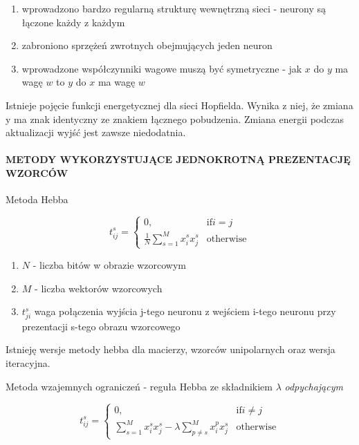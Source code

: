 \begin{enumerate}
 \item wprowadzono bardzo regularną strukturę wewnętrzną sieci - neurony są łączone każdy z każdym
 
 \item zabroniono sprzężeń zwrotnych obejmujących jeden neuron
 
 \item wprowadzone współczynniki wagowe muszą być symetryczne - jak $x$ do $y$ ma wagę $w$ to $y$ do $x$ ma wagę $w$
 
\end{enumerate}

Istnieje pojęcie funkcji energetycznej dla sieci Hopfielda. Wynika z niej, że zmiana y ma znak identyczny
ze znakiem łącznego pobudzenia. Zmiana energii podczas aktualizacji wyjść jest zawsze niedodatnia.

\paragraph{METODY WYKORZYSTUJĄCE JEDNOKROTNĄ PREZENTACJĘ WZORCÓW}

Metoda Hebba

\begin{equation}
 t_{ij}^s = \begin{cases}
    0,& \text{if} i = j \\
    \frac{1}{N} \sum_{s=1}^M x_i^s x_j^s & \text{otherwise} 
\end{cases}
\end{equation}

\begin{enumerate}
 \item $N$ - liczba bitów w obrazie wzorcowym
 \item $M$ - liczba wektorów wzorcowych
 \item $t_{ji}^s$ waga połączenia wyjścia j-tego neuronu z wejściem i-tego neuronu przy prezentacji s-tego obrazu wzorcowego
\end{enumerate}

Istnieję wersje metody hebba dla macierzy, wzorców unipolarnych oraz wersja iteracyjna.

Metoda wzajemnych ograniczeń - reguła Hebba ze składnikiem $\lambda$ \textit{odpychającym}

\begin{equation}
 t_{ij}^s = \begin{cases}
    0,& \text{if} i \ne j \\
    \sum_{s=1}^M x_i^s x_j^s - \lambda \sum_{p \ne s}^M x_i^p x_j^s & \text{otherwise} 
\end{cases}
\end{equation}

